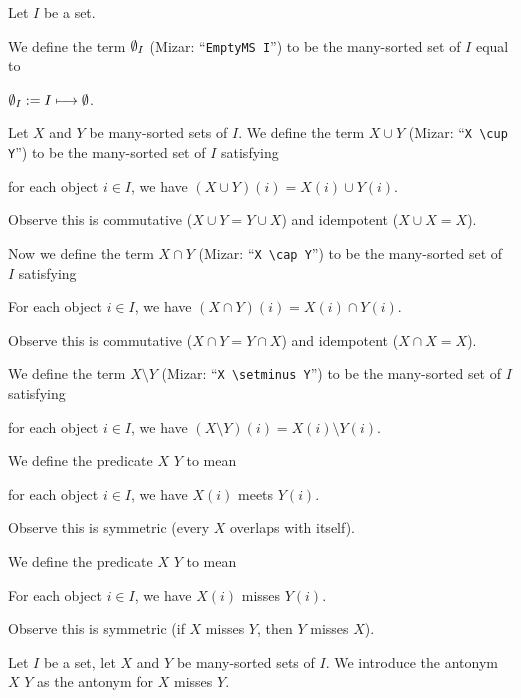 \documentclass{article}
\begin{document}
\begin{definition}
  Let $I$ be a set.

  We define the term $\emptyset_{I}$ (Mizar: ``\verb#EmptyMS I#'')
  to be the many-sorted set of $I$ equal to
  \begin{defn}
  \item $\emptyset_{I}:= I\longmapsto\emptyset$.
  \end{defn}
  Let $X$ and $Y$ be many-sorted sets of $I$.
  We define the term $X\cup Y$ (Mizar: ``\verb#X \cup Y#'') to be the
  many-sorted set of $I$ satisfying
  \begin{defn}
  \item for each object $i\in I$, we have $(X\cup Y)(i)=X(i)\cup Y(i)$.
  \end{defn}
  Observe this is commutative ($X\cup Y=Y\cup X$) and idempotent ($X\cup X=X$).

  Now we define the term $X\cap Y$ (Mizar: ``\verb#X \cap Y#'') to be
  the many-sorted set of $I$ satisfying
  \begin{defn}
  \item For each object $i\in I$, we have $(X\cap Y)(i)=X(i)\cap Y(i)$.
  \end{defn}
  Observe this is commutative ($X\cap Y=Y\cap X$) and idempotent ($X\cap X=X$).

  We define the term $X\setminus Y$ (Mizar: ``\verb#X \setminus Y#'') to be
  the many-sorted set of $I$ satisfying
  \begin{defn}
  \item for each object $i\in I$, we have $(X\setminus Y)(i)=X(i)\setminus Y(i)$.
  \end{defn}

  We define the predicate $X$  $Y$ to mean
  \begin{defn}
  \item for each object $i\in I$, we have $X(i)$ meets $Y(i)$.
  \end{defn}
  Observe this is symmetric (every $X$ overlaps with itself).

  We define the predicate $X$  $Y$ to mean
  \begin{defn}
  \item For each object $i\in I$, we have $X(i)$ misses $Y(i)$.
  \end{defn}
  Observe this is symmetric (if $X$ misses $Y$, then $Y$ misses $X$).
\end{definition}

\begin{notation}
  Let $I$ be a set, let $X$ and $Y$ be many-sorted sets of $I$.
  We introduce the antonym $X$  $Y$ as the antonym for $X$
  misses $Y$.
\end{notation}
\end{document}
